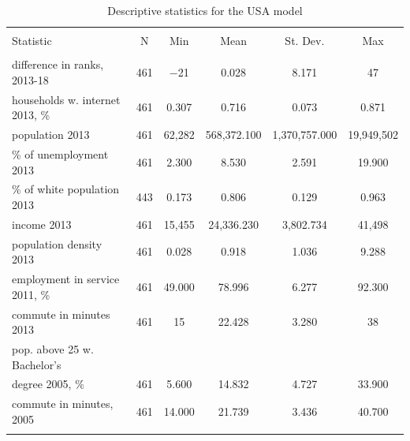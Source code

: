 \documentclass[10pt,letterpaper]{article}
\begin{document}
\begin{table}[!htbp] \centering 
  \caption{Descriptive statistics for the USA model\label{desc.usa}} 
  \label{} 
\small 
\begin{tabular}{@{\extracolsep{1pt}}lccccc} 
\\[-1.8ex]\hline 
\hline \\[-1.8ex] 
Statistic & \multicolumn{1}{c}{N} & \multicolumn{1}{c}{Min} & \multicolumn{1}{c}{Mean} & \multicolumn{1}{c}{St. Dev.} & \multicolumn{1}{c}{Max} \\ 
\hline \\[-1.8ex] 
difference in ranks, 2013-18 & 461 & $-$21 & 0.028 & 8.171 & 47 \\ 
households w. internet 2013, \% & 461 & 0.307 & 0.716 & 0.073 & 0.871 \\ 
population 2013 & 461 & 62,282 & 568,372.100 & 1,370,757.000 & 19,949,502 \\ 
\% of unemployment 2013 & 461 & 2.300 & 8.530 & 2.591 & 19.900 \\ 
\% of white population 2013 & 443 & 0.173 & 0.806 & 0.129 & 0.963 \\ 
income 2013 & 461 & 15,455 & 24,336.230 & 3,802.734 & 41,498 \\ 
population density 2013 & 461 & 0.028 & 0.918 & 1.036 & 9.288 \\ 
employment in service 2011, \% & 461 & 49.000 & 78.996 & 6.277 & 92.300 \\ 
commute in minutes 2013 & 461 & 15 & 22.428 & 3.280 & 38 \\ 
pop. above 25 w. Bachelor's \\
                             degree 2005, \% & 461 & 5.600 & 14.832 & 4.727 & 33.900 \\ 
commute in minutes, 2005 & 461 & 14.000 & 21.739 & 3.436 & 40.700 \\ 
\hline \\[-1.8ex] 
\end{tabular} 
\end{table}
\end{document}
